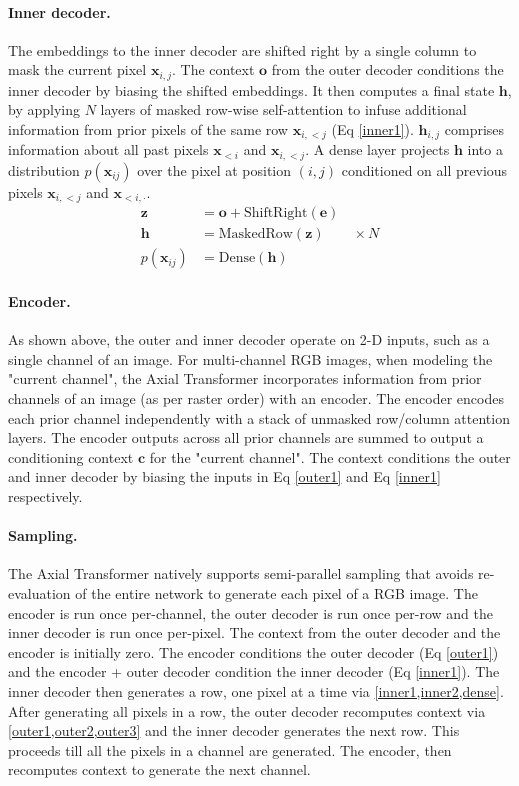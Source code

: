 \documentclass{article} \usepackage{iclr2021_conference,times}
\newcommand{\bb}[1]{\mathbf{#1}}
\newcommand{\be}{\bb{e}}
\newcommand{\bx}{\bb{x}}
\newcommand{\bc}{\bb{c}}
\newcommand{\bo}{\bb{o}}
\newcommand{\bh}{\bb{h}}
\newcommand{\bz}{\bb{z}}
\begin{document}
\paragraph{Inner decoder.} The embeddings to the inner decoder are shifted right by a single column to mask the current pixel $\bx_{i, j}$. The context $\bo$ from the outer decoder conditions the inner decoder by biasing the shifted embeddings. It then computes a final state $\bh$, by applying $N$ layers of masked row-wise self-attention to infuse additional information from prior pixels of the same row $\bx_{i, <j}$ (Eq \ref{inner1}). $\bh_{i, j}$ comprises information about all past pixels $\bx_{<i}$ and $\bx_{i, <j}$. A dense layer projects $\bh$ into a distribution $p(\bx_{ij})$ over the pixel at position $(i,j)$ conditioned on all previous pixels $\bx_{i,<j}$ and $\bx_{<i,\cdot}$.
\begin{align}
    \bz &= \bo + \text{ShiftRight}(\be) \label{inner1} \\
     \bh &= \text{MaskedRow}(\bz) \qquad \times N \label{inner2}\\
     p(\bx_{ij}) &= \text{Dense}(\bh)
     \label{dense}
\end{align}
\paragraph{Encoder.} As shown above, the outer and inner decoder operate on 2-D inputs, such as a single channel of an image. For multi-channel  RGB images, when modeling the "current channel", the Axial Transformer incorporates information from prior channels of an image (as per raster order) with an encoder. The encoder encodes each prior channel independently with a stack of unmasked row/column attention layers. The encoder outputs across all prior channels are summed to output a conditioning context $\bc$ for the "current channel". The context  conditions the outer and inner decoder by biasing the inputs in Eq \ref{outer1} and Eq \ref{inner1} respectively.

\paragraph{Sampling.} The Axial Transformer natively supports semi-parallel sampling that avoids re-evaluation of the entire network to generate each pixel of a RGB image. The encoder is run once per-channel, the outer decoder is run once per-row and the inner decoder is run once per-pixel. The context from the outer decoder and the encoder is initially zero. The encoder conditions the outer decoder (Eq \ref{outer1}) and the encoder + outer decoder condition the inner decoder (Eq \ref{inner1}). The inner decoder then generates a row, one pixel at a time via \cref{inner1,inner2,dense}. After generating all pixels in a row, the outer decoder recomputes context via \cref{outer1,outer2,outer3} and the inner decoder generates the next row. This proceeds till all the pixels in a channel are generated.
The encoder, then recomputes context to generate the next channel.
\end{document}
